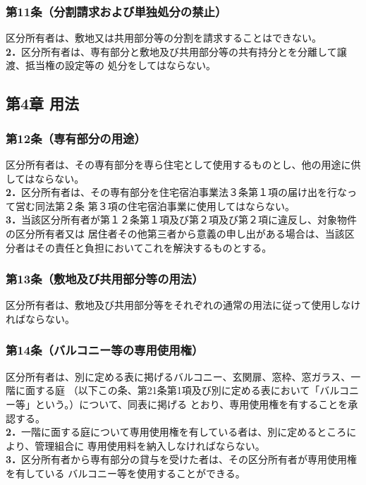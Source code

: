 \documentclass[
  luatex,
  paper=a4paper,
  fontsize=11pt,
  jafontsize=11pt,
  jlreq_notes,
]{jlreq}
\begin{document}
  \subsubsection*{第11条（分割請求および単独処分の禁止）}
  区分所有者は、敷地又は共用部分等の分割を請求することはできない。\\
  \textbf{2．}区分所有者は、専有部分と敷地及び共用部分等の共有持分とを分離して譲渡、抵当権の設定等の
  処分をしてはならない。
  
  \begin{center}
    \subsection*{第4章 用法}
  \end{center}
  \subsubsection*{第12条（専有部分の用途）}
  区分所有者は、その専有部分を専ら住宅として使用するものとし、他の用途に供してはならない。\\
  \textbf{2．}区分所有者は、その専有部分を住宅宿泊事業法３条第１項の届け出を行なって営む同法第２条
  第３項の住宅宿泊事業に使用してはならない。\\
  \textbf{3．}当該区分所有者が第１２条第１項及び第２項及び第２項に違反し、対象物件の区分所有者又は
  居住者その他第三者から意義の申し出がある場合は、当該区分者はその責任と負担においてこれを解決するものとする。
  \subsubsection*{第13条（敷地及び共用部分等の用法）}
  区分所有者は、敷地及び共用部分等をそれぞれの通常の用法に従って使用しなければならない。
  \subsubsection*{第14条（バルコニー等の専用使用権）}
  区分所有者は、別に定める表に掲げるバルコニー、玄関扉、窓枠、窓ガラス、一階に面する庭
  （以下この条、第21条第1項及び別に定める表において「バルコニー等」という。）について、同表に掲げる
  とおり、専用使用権を有することを承認する。\\
  \textbf{2．}一階に面する庭について専用使用権を有している者は、別に定めるところにより、管理組合に
  専用使用料を納入しなければならない。\\
  \textbf{3．}区分所有者から専有部分の貸与を受けた者は、その区分所有者が専用使用権を有している
  バルコニー等を使用することができる。
\end{document}

